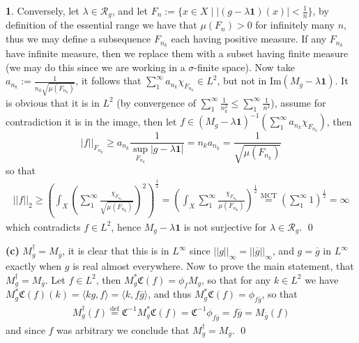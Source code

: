 \documentclass[11pt]{article}
\theoremstyle{definition}
\newtheorem{pb}{}
\newcommand{\set}[1]{\{#1\}}
\newcommand{\abs}[1]{\left\vert#1\right\vert}
\newcommand{\norm}[1]{\lvert\lvert#1\rvert\rvert}
\newcommand{\im}{\text{Im}}
\newcommand{\gen}[1]{\langle #1 \rangle}
\begin{document}
\begin{pb}
        Conversely, let \(\lambda \in \mathcal{R}_g\), and let \(F_n := \set{x \in X \mid \abs{(g-\lambda\mathbf{1})(x)} < \frac{1}{n}}\), by definition of the essential range we have that \(\mu(F_n) > 0\) for infinitely many \(n\), thus we may define a subsequence \(F_{n_k}\) each having positive measure. If any \(F_{n_k}\) have infinite measure, then we replace them with a subset having finite measure (we may do this since we are working in a \(\sigma\)-finite space). Now take \(a_{n_k} := \frac{1}{n_{k}\sqrt{\mu(F_{n_k})}}\), it follows that \(\sum_1^\infty a_{n_k}\chi_{F_{n_k}} \in L^2\), but not in \(\im(M_{g} - \lambda\mathbf{1})\). It is obvious that it is in \(L^2\) (by convergence of \(\sum_1^\infty \frac{1}{n_k^2}\leq\sum_1^\infty \frac{1}{n^2}\)), assume for contradiction it is in the image, then let \(f \in (M_{g} - \lambda\mathbf{1})^{-1}(\sum_1^\infty a_{n_k}\chi_{F_{n_k}})\), then 
        \[\abs{f}\vert_{F_{n_k}} \geq a_{n_k}\frac{1}{\sup_{F_{n_k}}\abs{g - \lambda\mathbf{1}}} = n_ka_{n_k} = \frac{1}{\sqrt{\mu(F_{n_k})}}\]
        so that
        \begin{align*}
            \norm{f}_2 \geq \left(\int_X \left(\sum_1^\infty \frac{\chi_{F_{n_k}}}{\sqrt{\mu(F_{n_k})}}\right)^2\right)^{\frac12} = \left(\int_X\sum_1^\infty \frac{\chi_{F_{n_k}}}{\mu(F_{n_k})}\right)^{\frac12} \overset{\text{MCT}}{=} \left(\sum_1^\infty 1\right)^{\frac12} = \infty
        \end{align*}
        which contradicts \(f \in L^2\), hence \(M_g - \lambda\mathbf{1}\) is not surjective for \(\lambda \in \mathcal{R}_g\). \qed

        \textbf{(c)} \(M_g^\dagger = M_{\overline{g}}\), it is clear that this is in \(L^\infty\) since \(\norm{g}_\infty = \norm{\overline{g}}_\infty\), and \(g = \overline{g}\) in \(L^\infty\) exactly when \(g\) is real almost everywhere. Now to prove the main statement, that \(M_g^\dagger = M_{\overline{g}}\). Let \(f \in L^2\), then \(M_g^* \mathfrak{C}(f) = \phi_f M_g\), so that for any \(k \in L^2\) we have \(M_g^* \mathfrak{C}(f)(k) = \gen{kg,f} = \gen{k,f \overline{g}}\), and thus \(M_g^* \mathfrak{C}(f) = \phi_{f \overline{g}}\), so that
        \begin{align*}
            M_g^\dagger(f) \overset{\text{def}}{=} \mathfrak{C}^{-1}M_g^*\mathfrak{C}(f) = \mathfrak{C}^{-1}\phi_{f \overline{g}} = f \overline{g} = M_{\overline{g}}(f)
        \end{align*}
        and since \(f\) was arbitrary we conclude that \(M_g^\dagger = M_{\overline{g}}\). \qed
    \end{pb}
\end{document}
